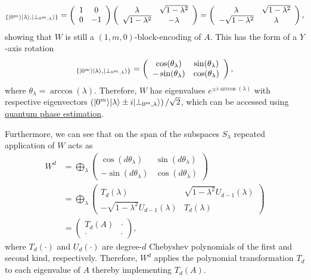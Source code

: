 \begin{refsection}
\begin{equation}
    [W]_{ \{  \ket{0^m}\ket{\lambda}, \ket{\perp_{0^m, \lambda}} \} } = \left(\begin{array}{cc} 1 & 0 \\ 0 & -1    \end{array}\right) \left(\begin{array}{cc} \lambda & \sqrt{1-\lambda^2} \\ \sqrt{1-\lambda^2} & -\lambda    \end{array}\right) = \left(\begin{array}{cc} \lambda & \sqrt{1-\lambda^2} \\ - \sqrt{1-\lambda^2} & \lambda    \end{array}\right),
\end{equation}
showing that $W$ is still a $(1, m, 0)$-block-encoding of $A$.
This has the form of a $Y$-axis rotation
\begin{equation}
    [W]_{ \{  \ket{0^m}\ket{\lambda}, \ket{\perp_{0^m, \lambda}} \} }=\left(\begin{array}{cc} \cos(\theta_\lambda) & \sin(\theta_\lambda) \\ -\sin(\theta_\lambda) & \cos(\theta_\lambda)    \end{array}\right),
\end{equation}
where $\theta_\lambda = \arccos(\lambda)$. 
Therefore, $W$ has eigenvalues $e^{\pm i \arccos(\lambda)}$ with respective eigenvectors $\left(\lvert0^m\rangle \lvert\lambda\rangle \pm i  \lvert\perp_{0^m, \lambda}\rangle \right)/\sqrt{2}$, which can be accessed using \hyperref[prim:QPE]{quantum phase estimation}.

Furthermore, we can see that on the span of the subspaces $S_\lambda$ repeated application of $W$ acts as
\begin{align}
    W^d &= \bigoplus_\lambda \left(\begin{array}{cc} \cos(d\theta_\lambda) & \sin(d\theta_\lambda) \\ -\sin(d\theta_\lambda) & \cos(d\theta_\lambda)    \end{array}\right) \\
    &= \bigoplus_\lambda\left(\begin{array}{cc} T_d(\lambda) & \sqrt{1-\lambda^2} U_{d-1}(\lambda) \\ -\sqrt{1-\lambda^2} U_{d-1}(\lambda) & T_d(\lambda)    \end{array}\right) \\
    &= \left(\begin{array}{cc} T_d(A) & \cdot \\ \cdot & \cdot    \end{array}\right),
\end{align}
where $T_d(\cdot)$ and $U_d(\cdot)$ are degree-$d$ Chebyshev polynomials of the first and second kind, respectively. Therefore, $W^d$ applies the polynomial transformation $T_d$ to each eigenvalue of $A$ thereby implementing $T_d(A)$.




\end{refsection}
